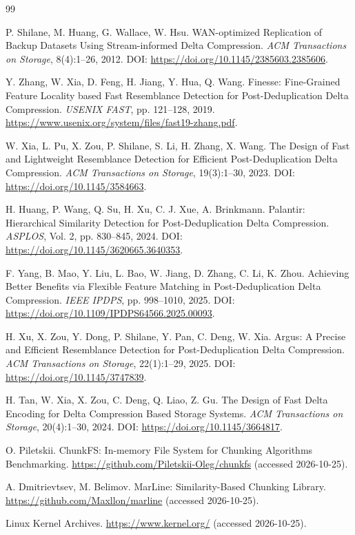 \documentclass[a4paper]{article}
\begin{document}
\begin{thebibliography}{99}

 P. Shilane, M. Huang, G. Wallace, W. Hsu. WAN-optimized Replication of Backup Datasets Using Stream-informed Delta Compression. \emph{ACM Transactions on Storage}, 8(4):1--26, 2012. DOI: \url{https://doi.org/10.1145/2385603.2385606}.

 Y. Zhang, W. Xia, D. Feng, H. Jiang, Y. Hua, Q. Wang. Finesse: Fine-Grained Feature Locality based Fast Resemblance Detection for Post-Deduplication Delta Compression. \emph{USENIX FAST}, pp. 121--128, 2019. \url{https://www.usenix.org/system/files/fast19-zhang.pdf}.

 W. Xia, L. Pu, X. Zou, P. Shilane, S. Li, H. Zhang, X. Wang. The Design of Fast and Lightweight Resemblance Detection for Efficient Post-Deduplication Delta Compression. \emph{ACM Transactions on Storage}, 19(3):1--30, 2023. DOI: \url{https://doi.org/10.1145/3584663}.

 H. Huang, P. Wang, Q. Su, H. Xu, C. J. Xue, A. Brinkmann. Palantir: Hierarchical Similarity Detection for Post-Deduplication Delta Compression. \emph{ASPLOS}, Vol. 2, pp. 830--845, 2024. DOI: \url{https://doi.org/10.1145/3620665.3640353}.

 F. Yang, B. Mao, Y. Liu, L. Bao, W. Jiang, D. Zhang, C. Li, K. Zhou. Achieving Better Benefits via Flexible Feature Matching in Post-Deduplication Delta Compression. \emph{IEEE IPDPS}, pp. 998--1010, 2025. DOI: \url{https://doi.org/10.1109/IPDPS64566.2025.00093}.

 H. Xu, X. Zou, Y. Dong, P. Shilane, Y. Pan, C. Deng, W. Xia. Argus: A Precise and Efficient Resemblance Detection for Post-Deduplication Delta Compression. \emph{ACM Transactions on Storage}, 22(1):1--29, 2025. DOI: \url{https://doi.org/10.1145/3747839}.

 H. Tan, W. Xia, X. Zou, C. Deng, Q. Liao, Z. Gu. The Design of Fast Delta Encoding for Delta Compression Based Storage Systems. \emph{ACM Transactions on Storage}, 20(4):1--30, 2024. DOI: \url{https://doi.org/10.1145/3664817}.

 O. Piletskii. ChunkFS: In-memory File System for Chunking Algorithms Benchmarking. \url{https://github.com/Piletskii-Oleg/chunkfs} (accessed 2026-10-25).

 A. Dmitrievtsev, M. Belimov. MarLine: Similarity-Based Chunking Library. \url{https://github.com/Maxllon/marline} (accessed 2026-10-25).

 Linux Kernel Archives. \url{https://www.kernel.org/} (accessed 2026-10-25).

\end{thebibliography}
\end{document}
